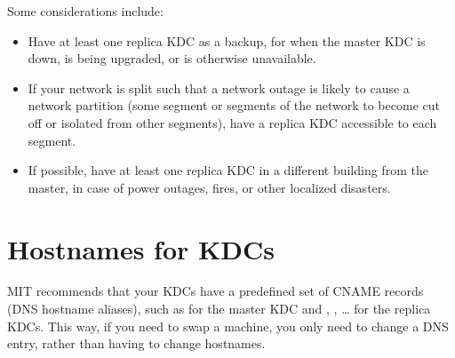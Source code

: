 \documentclass[letterpaper,10pt,english]{sphinxmanual}
\begin{document}
Some considerations include:
\begin{itemize}
\item {} 
Have at least one replica KDC as a backup, for when the master KDC
is down, is being upgraded, or is otherwise unavailable.

\item {} 
If your network is split such that a network outage is likely to
cause a network partition (some segment or segments of the network
to become cut off or isolated from other segments), have a replica
KDC accessible to each segment.

\item {} 
If possible, have at least one replica KDC in a different building
from the master, in case of power outages, fires, or other localized
disasters.

\end{itemize}


\section{Hostnames for KDCs}
\label{\detokenize{admin/realm_config:kdc-hostnames}}\label{\detokenize{admin/realm_config:hostnames-for-kdcs}}
MIT recommends that your KDCs have a predefined set of CNAME records
(DNS hostname aliases), such as  for the master KDC and
, , … for the replica KDCs.  This way,
if you need to swap a machine, you only need to change a DNS entry,
rather than having to change hostnames.
\end{document}
